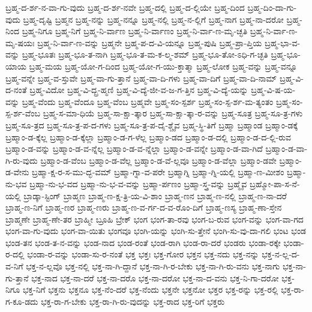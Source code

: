 {ಬ್ರಹ್ಮ-ದ-ರ್ಶ-ನ-ವಾ-ಗು-ವುದು
ಬ್ರಹ್ಮ-ದ-ರ್ಶ-ನವೇ
ಬ್ರಹ್ಮ-ದಲ್ಲಿ
ಬ್ರಹ್ಮ-ದ-ಲ್ಲಿಯೇ
ಬ್ರಹ್ಮ-ದಿಂದ
ಬ್ರಹ್ಮ-ದಿಂ-ದಾ-ಗು-ವುದು
ಬ್ರಹ್ಮ-ದೃಷ್ಟಿ
ಬ್ರಹ್ಮನ
ಬ್ರಹ್ಮ-ನನ್ನು
ಬ್ರಹ್ಮ-ನನ್ನೂ
ಬ್ರಹ್ಮ-ನಲ್ಲಿ
ಬ್ರಹ್ಮ-ನ-ಲ್ಲಿಗೆ
ಬ್ರಹ್ಮ-ನಾಗ
ಬ್ರಹ್ಮ-ನಾ-ದರೋ
ಬ್ರಹ್ಮ-ನಿಂದ
ಬ್ರಹ್ಮ-ನಿಗೂ
ಬ್ರಹ್ಮ-ನಿಗೆ
ಬ್ರಹ್ಮ-ನಿ-ರ್ವಾಣ
ಬ್ರಹ್ಮ-ನಿ-ರ್ವಾಣಂ
ಬ್ರಹ್ಮ-ನಿ-ರ್ವಾ-ಣ-ಮೃ-ಚ್ಛತಿ
ಬ್ರಹ್ಮ-ನಿ-ರ್ವಾ-ಣ-ಮೃ-ಷಯಃ
ಬ್ರಹ್ಮ-ನಿ-ರ್ವಾ-ಣ-ವನ್ನು
ಬ್ರಹ್ಮನೇ
ಬ್ರಹ್ಮ-ಪ-ದ-ವಿ-ಯನ್ನೂ
ಬ್ರಹ್ಮ-ಪುಷಿ
ಬ್ರಹ್ಮ-ಪ್ರಾ-ಪ್ತಿಯ
ಬ್ರಹ್ಮ-ಭಾ-ವ-ವನ್ನು
ಬ್ರಹ್ಮ-ಭೂತಃ
ಬ್ರಹ್ಮ-ಭೂ-ತ-ನಾಗಿ
ಬ್ರಹ್ಮ-ಭೂ-ತ-ಮ-ಕ-ಲ್ಮ-ಶಮ್
ಬ್ರಹ್ಮ-ಭೂ-ತೋ-ಽಧಿ-ಗ-ಚ್ಛತಿ
ಬ್ರಹ್ಮ-ಭೂ-ಯಾಯ
ಬ್ರಹ್ಮ-ಮಯ
ಬ್ರಹ್ಮ-ಯೋ-ಗ-ದಿಂದ
ಬ್ರಹ್ಮ-ಯೋ-ಗ-ಯು-ಕ್ತಾತ್ಮಾ
ಬ್ರಹ್ಮ-ಲೋಕ
ಬ್ರಹ್ಮ-ವನ್ನು
ಬ್ರಹ್ಮ-ವನ್ನೂ
ಬ್ರಹ್ಮ-ವನ್ನೇ
ಬ್ರಹ್ಮ-ವ-ಸ್ತುವೇ
ಬ್ರಹ್ಮ-ವಾ-ಗು-ತ್ತಾನೆ
ಬ್ರಹ್ಮ-ವಾ-ದಿ-ಗಳು
ಬ್ರಹ್ಮ-ವಾ-ದಿಗೆ
ಬ್ರಹ್ಮ-ವಾ-ದಿ-ನಾಮ್
ಬ್ರಹ್ಮ-ವಿ-ದ-ನಂತೆ
ಬ್ರಹ್ಮ-ವಿದೋ
ಬ್ರಹ್ಮ-ವಿ-ದ್ಬ್ರ-ಹ್ಮಣಿ
ಬ್ರಹ್ಮ-ವಿ-ದ್ಯೆ-ಜೀ-ವ-ಜ-ಗ-ತ್ತಿನ
ಬ್ರಹ್ಮ-ವಿ-ದ್ಯೆ-ಯನ್ನು
ಬ್ರಹ್ಮ-ವಿ-ಷ-ಯ-ವನ್ನು
ಬ್ರಹ್ಮ-ವೆಂದು
ಬ್ರಹ್ಮ-ವೆಂದೂ
ಬ್ರಹ್ಮ-ವೆಂಬ
ಬ್ರಹ್ಮವೇ
ಬ್ರಹ್ಮ-ಸಂ-ಸ್ಪರ್ಶ
ಬ್ರಹ್ಮ-ಸಂ-ಸ್ಪ-ರ್ಶ-ಮ-ತ್ಯಂತಂ
ಬ್ರಹ್ಮ-ಸಂ-ಸ್ಪ-ರ್ಶ-ವೆಂಬ
ಬ್ರಹ್ಮ-ಸ-ಮಾ-ಧಿಯೆ
ಬ್ರಹ್ಮ-ಸಾ-ಕ್ಷಾ-ತ್ಕಾರ
ಬ್ರಹ್ಮ-ಸಾ-ಕ್ಷಾ-ತ್ಕಾ-ರ-ವನ್ನು
ಬ್ರಹ್ಮ-ಸೂತ್ರ
ಬ್ರಹ್ಮ-ಸೂ-ತ್ರ-ಗಳು
ಬ್ರಹ್ಮ-ಸೂ-ತ್ರದ
ಬ್ರಹ್ಮ-ಸೂ-ತ್ರ-ಪ-ದ-ಗಳು
ಬ್ರಹ್ಮ-ಸೂ-ತ್ರ-ಪ-ದೈ-ಶ್ಚೈವ
ಬ್ರಹ್ಮ-ಸ್ಥಿ-ತಿಗೆ
ಬ್ರಹ್ಮಾ
ಬ್ರಹ್ಮಾಂಡ
ಬ್ರಹ್ಮಾಂ-ಡಕ್ಕೆ
ಬ್ರಹ್ಮಾಂ-ಡ-ಕ್ಕೆಲ್ಲ
ಬ್ರಹ್ಮಾಂ-ಡ-ಕ್ಕೆಲ್ಲಾ
ಬ್ರಹ್ಮಾಂ-ಡ-ಗ-ಳೆಲ್ಲ
ಬ್ರಹ್ಮಾಂ-ಡದ
ಬ್ರಹ್ಮಾಂ-ಡ-ದಲ್ಲಿ
ಬ್ರಹ್ಮಾಂ-ಡ-ದ-ಲ್ಲಿ-ರುವ
ಬ್ರಹ್ಮಾಂ-ಡ-ವನ್ನು
ಬ್ರಹ್ಮಾಂ-ಡ-ವ-ನ್ನೆಲ್ಲ
ಬ್ರಹ್ಮಾಂ-ಡ-ವ-ನ್ನೆಲ್ಲಾ
ಬ್ರಹ್ಮಾಂ-ಡ-ವನ್ನೇ
ಬ್ರಹ್ಮಾಂ-ಡ-ವಾ-ಗಿದೆ
ಬ್ರಹ್ಮಾಂ-ಡ-ವಾ-ಗಿ-ರು-ವುದು
ಬ್ರಹ್ಮಾಂ-ಡ-ವೆಂಬ
ಬ್ರಹ್ಮಾಂ-ಡ-ವೆಲ್ಲ
ಬ್ರಹ್ಮಾಂ-ಡ-ವೆ-ಲ್ಲವೂ
ಬ್ರಹ್ಮಾಂ-ಡ-ವೆಲ್ಲಾ
ಬ್ರಹ್ಮಾಂ-ಡವೇ
ಬ್ರಹ್ಮಾಂ-ಡ-ವೇನು
ಬ್ರಹ್ಮಾ-ಕ್ಷ-ರ-ಸ-ಮು-ದ್ಭ-ವಮ್
ಬ್ರಹ್ಮಾ-ಗ್ನಾ-ವ-ಪರೇ
ಬ್ರಹ್ಮಾಗ್ನಿ
ಬ್ರಹ್ಮಾ-ಗ್ನಿ-ಯಲ್ಲಿ
ಬ್ರಹ್ಮಾ-ಣ-ಮೀಶಂ
ಬ್ರಹ್ಮಾ-ನು-ಭವ
ಬ್ರಹ್ಮಾ-ನು-ಭ-ವದ
ಬ್ರಹ್ಮಾ-ನು-ಭ-ವ-ವನ್ನು
ಬ್ರಹ್ಮಾ-ರ್ಪಣಂ
ಬ್ರಹ್ಮಾ-ಸ್ತ್ರ-ವನ್ನು
ಬ್ರಹ್ಮೈವ
ಬ್ರಹ್ಮೋ-ಪಾ-ಸ-ನೆ-ಯಲ್ಲಿ
ಬ್ರಾಡ್ಕಾ-ಸ್ಟಿಂಗ್
ಬ್ರಾಹ್ಮಣ
ಬ್ರಾಹ್ಮ-ಣ-ಕ್ಷ-ತ್ರಿ-ಯ-ವಿ-ಶಾಂ
ಬ್ರಾಹ್ಮ-ಣನ
ಬ್ರಾಹ್ಮ-ಣ-ನಲ್ಲಿ
ಬ್ರಾಹ್ಮ-ಣ-ನಾ-ದರೆ
ಬ್ರಾಹ್ಮ-ಣ-ನಿಗೆ
ಬ್ರಾಹ್ಮ-ಣರ
ಬ್ರಾಹ್ಮ-ಣರು
ಬ್ರಾಹ್ಮ-ಣ-ವ-ರ್ಗ-ದ-ವ-ರೊಂ-ದಿಗೆ
ಬ್ರಾಹ್ಮ-ಣಸ್ಯ
ಬ್ರಾಹ್ಮ-ಣಾ-ಸ್ತೇನ
ಬ್ರಾಹ್ಮಣೇ
ಬ್ರಾಹ್ಮ-ಣೇ-ತರ
ಬ್ರಾಹ್ಮೀ
ಬ್ರೂಹಿ
ಬ್ರೇಕ್
ಭಂಗ
ಭಂಗ-ತಾ-ರವು
ಭಂಗ-ಬ-ರುವ
ಭಂಗ-ವನ್ನು
ಭಂಗ-ವಾ-ಗದ
ಭಂಗ-ವಾ-ಗು-ವುದು
ಭಂಗ-ವಾ-ಯಿತು
ಭಂಗವೂ
ಭಂಗಿ-ಯನ್ನು
ಭಂಗಿ-ಸು-ತ್ತೇನೆ
ಭಂಗಿ-ಸು-ವು-ದಾ-ಗಲಿ
ಭಂಟ
ಭಂಡ
ಭಂಡ-ತನ
ಭಂಡ-ತ-ನ-ವನ್ನು
ಭಂಡ-ನಾದ
ಭಂಡ-ರಂತೆ
ಭಂಡ-ರಾಗಿ
ಭಂಡ-ರಾ-ದರೆ
ಭಂಡರು
ಭಂಡಾ-ರಕ್ಕೇ
ಭಂಡಾ-ರ-ದಲ್ಲಿ
ಭಂಡಾ-ರ-ವನ್ನು
ಭಂಡಾ-ಸು-ರ-ನಂತೆ
ಭಕ್ತ
ಭಕ್ತಃ
ಭಕ್ತ-ಗೋರ
ಭಕ್ತನ
ಭಕ್ತ-ನದು
ಭಕ್ತ-ನನ್ನು
ಭಕ್ತ-ನ-ಲ್ಲ-ದ-ವ-ನಿಗೆ
ಭಕ್ತ-ನ-ಲ್ಲವೊ
ಭಕ್ತ-ನಲ್ಲಿ
ಭಕ್ತ-ನಾ-ಗಿ-ದ್ದಾನೆ
ಭಕ್ತ-ನಾ-ಗಿ-ರ-ಬೇಕು
ಭಕ್ತ-ನಾ-ಗಿ-ರು-ವನು
ಭಕ್ತ-ನಾಗು
ಭಕ್ತ-ನಾ-ಗು-ತ್ತಾನೆ
ಭಕ್ತ-ನಾದ
ಭಕ್ತ-ನಾ-ದರೆ
ಭಕ್ತ-ನಾ-ದರೊ
ಭಕ್ತ-ನಾ-ದರೋ
ಭಕ್ತ-ನಾ-ದ-ವನು
ಭಕ್ತ-ನಿ-ಗಾ-ದರೋ
ಭಕ್ತ-ನಿಗೂ
ಭಕ್ತ-ನಿಗೆ
ಭಕ್ತನು
ಭಕ್ತನೂ
ಭಕ್ತ-ನೆಂ-ದರೆ
ಭಕ್ತ-ನೆಂದು
ಭಕ್ತನೇ
ಭಕ್ತನೋ
ಭಕ್ತರ
ಭಕ್ತ-ರನ್ನು
ಭಕ್ತ-ರಲ್ಲಿ
ಭಕ್ತ-ರಾ-ಗ-ಕೂ-ಡದು
ಭಕ್ತ-ರಾ-ಗ-ಬೇಕು
ಭಕ್ತ-ರಾ-ಗಿ-ರು-ವುದನ್ನು
ಭಕ್ತ-ರಾದ
ಭಕ್ತ-ರಿಗೆ
ಭಕ್ತರು
}
